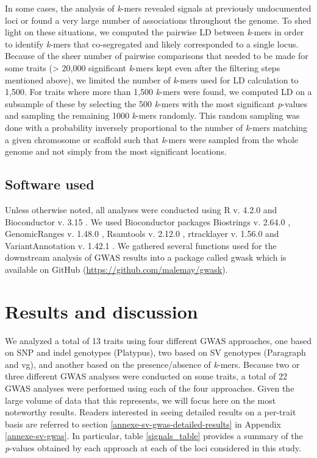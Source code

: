 In some cases, the analysis of \emph{k}-mers revealed signals at previously
undocumented loci or found a very large number of associations throughout the
genome. To shed light on these situations, we computed the pairwise LD between
\emph{k}-mers in order to identify \emph{k}-mers that co-segregated and
likely corresponded to a single locus. Because of the sheer number of pairwise
comparisons that needed to be made for some traits (> 20,000 significant
\emph{k}-mers kept even after the filtering steps mentioned above), we limited
the number of \emph{k}-mers used for LD calculation to 1,500. For traits where
more than 1,500 \emph{k}-mers were found, we computed LD on a subsample of
these by selecting the 500 \emph{k}-mers with the most significant
\emph{p}-values and sampling the remaining 1000 \emph{k}-mers randomly. This
random sampling was done with a probability inversely proportional to the
number of \emph{k}-mers matching a given chromosome or scaffold such that
\emph{k}-mers were sampled from the whole genome and not simply from the most
significant locations.

\subsection{Software used}
\label{sv-gwas-software-used}

Unless otherwise noted, all analyses were conducted using R v. 4.2.0
\citep{r2022} and Bioconductor v. 3.15 \citep{huber2015}. We used Bioconductor
packages Biostrings v. 2.64.0 \citep{pages2022}, GenomicRanges v. 1.48.0
\citep{lawrence2013}, Rsamtools v. 2.12.0 \citep{rsamtools2022}, rtracklayer v.
1.56.0 \citep{lawrence2009} and VariantAnnotation v. 1.42.1
\citep{obenchain2014}.  We gathered several functions used for the downstream
analysis of GWAS results into a package called gwask which is available on
GitHub (\url{https://github.com/malemay/gwask}).

\section{Results and discussion}
\label{sv-gwas-results-discussion}

We analyzed a total of 13 traits using four different GWAS approaches, one
based on SNP and indel genotypes (Platypus), two based on SV genotypes (Paragraph and
vg), and another based on the presence/absence of \textit{k}-mers.
Because two or three different GWAS analyses were conducted on some traits, a
total of 22 GWAS analyses were performed using each of the four approaches.
Given the large volume of data that this represents, we will focus here on the
most noteworthy results. Readers interested in seeing detailed results on a
per-trait basis are referred to section \ref{annexe-sv-gwas-detailed-results}
in Appendix \ref{annexe-sv-gwas}. In particular, table \ref{signals_table}
provides a summary of the \textit{p}-values obtained by each approach at each
of the loci considered in this study.

